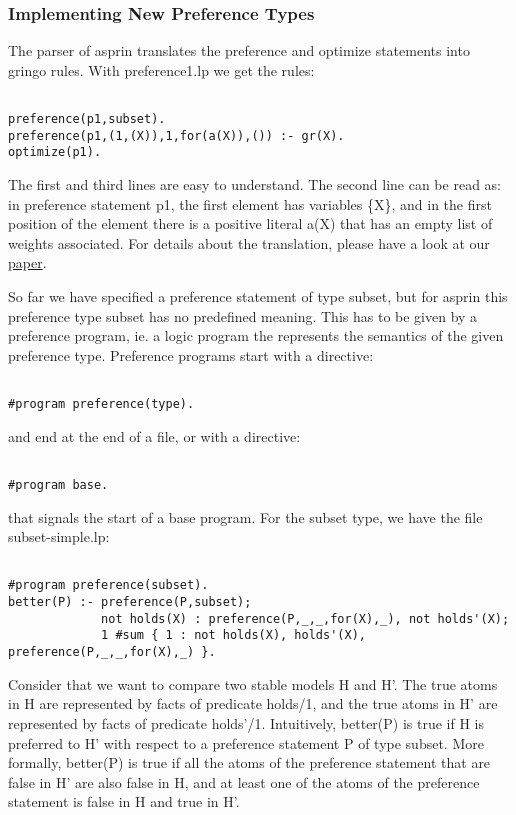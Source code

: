 \subsubsection{Implementing New Preference Types}

 The parser of asprin translates the preference and optimize statements into gringo rules.  With preference1.lp we get the rules: 
\begin{verbatim}

preference(p1,subset).
preference(p1,(1,(X)),1,for(a(X)),()) :- gr(X).
optimize(p1).
\end{verbatim}

 The first and third lines are easy to understand. The second line can be read as: in preference statement p1, the first element has variables \{X\},  and in the first position of the element there is a positive literal a(X)  that has an empty list of weights associated. For details about the translation, please have a look at our  \href{files/brderosc14a.pdf}{paper}. 

 So far we have specified a preference statement of type subset, but for asprin this preference type subset has no predefined meaning. This has to be given by a preference program,  ie. a logic program the represents the semantics of the given preference type. Preference programs start with a directive: 
\begin{verbatim}

#program preference(type).
\end{verbatim}

 and end at the end of a file, or with a directive:  
\begin{verbatim}

#program base.
\end{verbatim}

 that signals the start of a base program. For the subset type, we have the file subset-simple.lp: 
\begin{verbatim}

#program preference(subset).
better(P) :- preference(P,subset);
             not holds(X) : preference(P,_,_,for(X),_), not holds'(X);
             1 #sum { 1 : not holds(X), holds'(X), preference(P,_,_,for(X),_) }.
\end{verbatim}

 Consider that we want to compare two stable models H and H'. The true atoms in H are represented by facts of predicate holds/1,  and the true atoms in H' are represented by facts of predicate holds'/1. Intuitively, better(P) is true if H is preferred to H' with respect to a preference statement P of type subset. More formally, better(P) is true if all the atoms of the preference statement that are false in H' are also false in H,  and at least one of the atoms of the preference statement is false in H and true in H'. 

